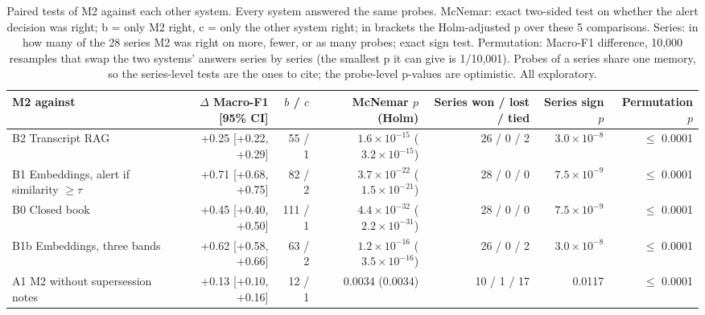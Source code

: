 \begin{table}[tbp]
\centering
\small
\caption{Paired tests of M2 against each other system. Every system answered the same probes. McNemar: exact two-sided test on whether the alert decision was right; b = only M2 right, c = only the other system right; in brackets the Holm-adjusted p over these 5 comparisons. Series: in how many of the 28 series M2 was right on more, fewer, or as many probes; exact sign test. Permutation: Macro-F1 difference, 10,000 resamples that swap the two systems' answers series by series (the smallest p it can give is 1/10,001). Probes of a series share one memory, so the series-level tests are the ones to cite; the probe-level p-values are optimistic. All exploratory.}
\label{tab:memoriabench-tests}
\begin{tabular}{@{}lrrrrrr@{}}
\toprule
M2 against & $\Delta$ Macro-F1 [95\% CI] & $b$ / $c$ & McNemar $p$ (Holm) & Series won / lost / tied & Series sign $p$ & Permutation $p$ \\
\midrule
B2 Transcript RAG & +0.25 [+0.22, +0.29] & 55 / 1 & $1.6\times10^{-15}$ ($3.2\times10^{-15}$) & 26 / 0 / 2 & $3.0\times10^{-8}$ & $\le$ 0.0001 \\
B1 Embeddings, alert if similarity $\ge \tau$ & +0.71 [+0.68, +0.75] & 82 / 2 & $3.7\times10^{-22}$ ($1.5\times10^{-21}$) & 28 / 0 / 0 & $7.5\times10^{-9}$ & $\le$ 0.0001 \\
B0 Closed book & +0.45 [+0.40, +0.50] & 111 / 1 & $4.4\times10^{-32}$ ($2.2\times10^{-31}$) & 28 / 0 / 0 & $7.5\times10^{-9}$ & $\le$ 0.0001 \\
B1b Embeddings, three bands & +0.62 [+0.58, +0.66] & 63 / 2 & $1.2\times10^{-16}$ ($3.5\times10^{-16}$) & 26 / 0 / 2 & $3.0\times10^{-8}$ & $\le$ 0.0001 \\
A1 M2 without supersession notes & +0.13 [+0.10, +0.16] & 12 / 1 & 0.0034 (0.0034) & 10 / 1 / 17 & 0.0117 & $\le$ 0.0001 \\
\bottomrule
\end{tabular}
\end{table}
